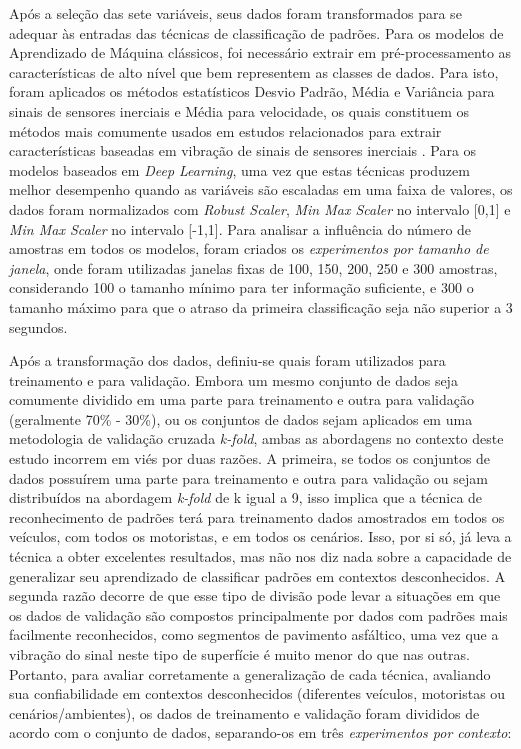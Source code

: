 Após a seleção das sete variáveis, seus dados foram transformados para se adequar às entradas das técnicas de classificação de padrões. Para os modelos de Aprendizado de Máquina clássicos, foi necessário extrair em pré-processamento as características de alto nível que bem representem as classes de dados. Para isto, foram aplicados os métodos estatísticos Desvio Padrão, Média e Variância para sinais de sensores inerciais e Média para velocidade, os quais constituem os métodos mais comumente usados em estudos relacionados para extrair características baseadas em vibração de sinais de sensores inerciais \cite{Alqudah2016,Andria2016,BelloSalau2018,Bose2018,Hou2017,Li2016,Lima2016,Pholprasit2015,Prapulla2017,Savera2016,Singh2017}. Para os modelos baseados em \textit{Deep Learning}, uma vez que estas técnicas produzem melhor desempenho quando as variáveis são escaladas em uma faixa de valores, os dados foram normalizados com \textit{Robust Scaler}, \textit{Min Max Scaler} no intervalo [0,1] e \textit{Min Max Scaler} no intervalo [-1,1]. Para analisar a influência do número de amostras em todos os modelos, foram criados os \emph{experimentos por tamanho de janela}, onde foram utilizadas janelas fixas de 100, 150, 200, 250 e 300 amostras, considerando 100 o tamanho mínimo para ter informação suficiente, e 300 o tamanho máximo para que o atraso da primeira classificação seja não superior a 3 segundos. 

Após a transformação dos dados, definiu-se quais foram utilizados para treinamento e para validação. Embora um mesmo conjunto de dados seja comumente dividido em uma parte para treinamento e outra para validação (geralmente 70\% - 30\%), ou os conjuntos de dados sejam aplicados em uma metodologia de validação cruzada \textit{k-fold}, ambas as abordagens no contexto deste estudo incorrem em viés por duas razões. A primeira, se todos os conjuntos de dados possuírem uma parte para treinamento e outra para validação ou sejam distribuídos na abordagem \textit{k-fold} de k igual a 9, isso implica que a técnica de reconhecimento de padrões terá para treinamento dados amostrados em todos os veículos, com todos os motoristas, e em todos os cenários. Isso, por si só, já leva a técnica a obter excelentes resultados, mas não nos diz nada sobre a capacidade de generalizar seu aprendizado de classificar padrões em contextos desconhecidos. A segunda razão decorre de que esse tipo de divisão pode levar a situações em que os dados de validação são compostos principalmente por dados com padrões mais facilmente reconhecidos, como segmentos de pavimento asfáltico, uma vez que a vibração do sinal neste tipo de superfície é muito menor do que nas outras. Portanto, para avaliar corretamente a generalização de cada técnica, avaliando sua confiabilidade em contextos desconhecidos (diferentes veículos, motoristas ou cenários/ambientes), os dados de treinamento e validação foram divididos de acordo com o conjunto de dados, separando-os em três \emph{experimentos por contexto}:

